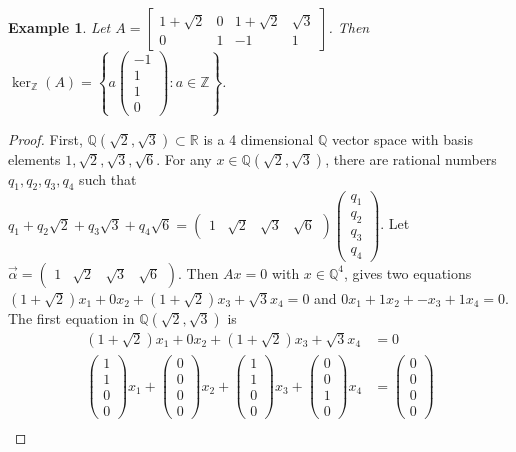 \documentclass{article}
\newcommand{\Z}[0]{\mathbb{Z}}		%
\newcommand{\Q}[0]{\mathbb{Q}}		%
\newcommand{\R}[0]{\mathbb{R}}		%
\newtheorem{ex}[thm]{Example}
\theoremstyle{definition}
\theoremstyle{remark}
\begin{document}
\begin{ex}\label{DimDiff}
Let $A = \begin{bmatrix}1+\sqrt{2} & 0 & 1+\sqrt{2} & \sqrt{3} \\ 0 & 1 & -1 &1\end{bmatrix}$. Then $\ker_\Z(A) = \left\{a\begin{pmatrix} -1\\ 1\\ 1\\ 0\end{pmatrix}: a\in \Z\right\}$. 
\end{ex}
\begin{proof}
First, $\Q(\sqrt{2},\sqrt{3})\subset \R$ is a  4 dimensional $\Q$ vector space with basis elements $1,\sqrt{2},\sqrt{3},\sqrt{6}$. For any $x\in \Q(\sqrt{2},\sqrt{3})$, there are rational numbers $q_1,q_2,q_3,q_4$ such that $q_1+q_2\sqrt{2} +q_3\sqrt{3} +q_4\sqrt{6} = \begin{pmatrix}1& \sqrt{2} & \sqrt{3} & \sqrt{6} \end{pmatrix}\begin{pmatrix} q_1\\ q_2\\q_3\\q_4\end{pmatrix}$.  Let $\vec{\alpha} = \begin{pmatrix}1& \sqrt{2} & \sqrt{3} & \sqrt{6} \end{pmatrix}$. Then $Ax = 0$ with $x\in \Q^4$, gives two equations $(1+\sqrt{2}) x_1 + 0 x_2 + (1+\sqrt{2}) x_3 + \sqrt{3}x_4 = 0$ and  $0x_1 + 1 x_2 + - x_3 + 1x_4 = 0$. The first equation in $\Q(\sqrt{2},\sqrt{3})$ is \begin{align}
    (1+\sqrt{2}) x_1 + 0 x_2 + (1+\sqrt{2}) x_3 + \sqrt{3}x_4 &= 0\\ 
     \begin{pmatrix}1\\1\\0\\0\end{pmatrix} x_1 +\begin{pmatrix}0\\0\\0\\0\end{pmatrix} x_2+  \begin{pmatrix}1\\1\\0\\0\end{pmatrix} x_3+  \begin{pmatrix}0\\0\\1\\0\end{pmatrix} x_4& =\begin{pmatrix}0\\0\\0\\0\end{pmatrix} \\ 

\end{align}
\end{proof}
\end{document}
